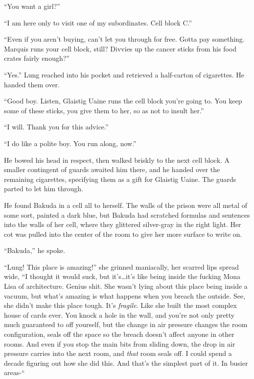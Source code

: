 ``You want a girl?''



``I am here only to visit one of my subordinates.  Cell block C.''



``Even if you aren't buying, can't let you through for free.  Gotta pay something.  Marquis runs your cell block, still?  Divvies up the cancer sticks from his food crates fairly enough?''



``Yes.''  Lung reached into his pocket and retrieved a half-carton of cigarettes.  He handed them over.



``Good boy.  Listen, Glaistig Uaine runs the cell block you're going to.  You keep some of these sticks, you give them to her, so as not to insult her.''



``I will.  Thank you for this advice.''



``I do like a polite boy.  You run along, now.''



He bowed his head in respect, then walked briskly to the next cell block.  A smaller contingent of guards awaited him there, and he handed over the remaining cigarettes, specifying them as a gift for Glaistig Uaine.  The guards parted to let him through.



He found Bakuda in a cell all to herself.  The walls of the prison were all metal of some sort, painted a dark blue, but Bakuda had scratched formulas and sentences into the walls of her cell, where they glittered silver-gray in the right light.  Her cot was pulled into the center of the room to give her more surface to write on.



``Bakuda,'' he spoke.



``Lung!  This place is amazing!'' she grinned maniacally, her scarred lips spread wide, ``I thought it would suck, but it's\ldots it's like being inside the fucking Mona Lisa of architecture.  Genius shit.  She wasn't lying about this place being inside a vacuum, but what's amazing is what happens when you breach the outside.  See, she didn't make this place tough.  It's \emph{fragile}.  Like she built the most complex house of cards ever.  You knock a hole in the wall, and you're not only pretty much guaranteed to off yourself, but the change in air pressure changes the room configuration, seals off the space so the breach doesn't affect anyone in other rooms.  And even if you stop the main bits from sliding down, the drop in air pressure carries into the next room, and \emph{that} room seals off.  I could spend a decade figuring out how she did this.  And that's the simplest part of it.  In busier areas-``



